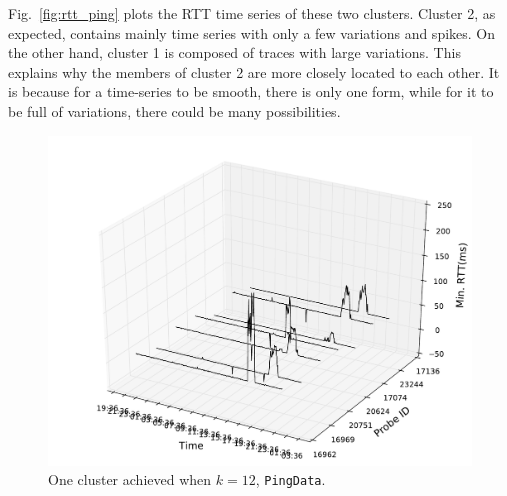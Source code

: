 Fig.~\ref{fig:rtt_ping} plots the RTT time series of these two clusters. Cluster 2, as expected, contains mainly time series with only a few variations and spikes. 
On the other hand, cluster 1 is composed of traces with large variations.
This explains why the members of cluster 2 are more closely located to each other. 
It is because for a time-series to be smooth, there is only one form, while for it to be full of variations, there could be many possibilities.

\begin{figure}[!htb]
\centering
\includegraphics[width=\textwidth]{gfx/chap3/rtt3d_ft_pam_cls8.pdf}
\caption{One cluster achieved when $k=12$, \texttt{PingData}.}
\label{fig:cls8_k12}
\end{figure}

